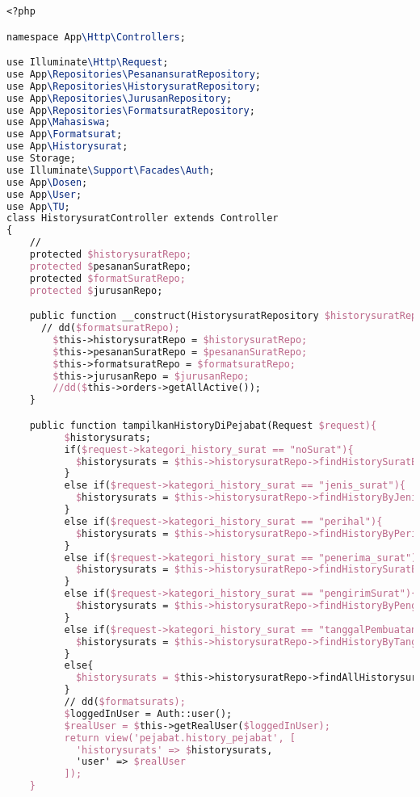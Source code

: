 \begin{lstlisting}[language=tex,basicstyle=\tiny,caption=HistorysuratController.php]
<?php

namespace App\Http\Controllers;

use Illuminate\Http\Request;
use App\Repositories\PesanansuratRepository;
use App\Repositories\HistorysuratRepository;
use App\Repositories\JurusanRepository;
use App\Repositories\FormatsuratRepository;
use App\Mahasiswa;
use App\Formatsurat;
use App\Historysurat;
use Storage;
use Illuminate\Support\Facades\Auth;
use App\Dosen;
use App\User;
use App\TU;
class HistorysuratController extends Controller
{
    //
    protected $historysuratRepo;
    protected $pesananSuratRepo;
    protected $formatSuratRepo;
    protected $jurusanRepo;

    public function __construct(HistorysuratRepository $historysuratRepo, PesanansuratRepository $pesananSuratRepo, FormatsuratRepository $formatsuratRepo, JurusanRepository $jurusanRepo){
      // dd($formatsuratRepo);
        $this->historysuratRepo = $historysuratRepo;
        $this->pesananSuratRepo = $pesananSuratRepo;
        $this->formatsuratRepo = $formatsuratRepo;
        $this->jurusanRepo = $jurusanRepo;
        //dd($this->orders->getAllActive());
    }

    public function tampilkanHistoryDiPejabat(Request $request){
          $historysurats;
          if($request->kategori_history_surat == "noSurat"){
            $historysurats = $this->historysuratRepo->findHistorySuratByNomorSurat($request->searchBox);
          }
          else if($request->kategori_history_surat == "jenis_surat"){
            $historysurats = $this->historysuratRepo->findHistoryByJenisSurat($request->searchBox);
          }
          else if($request->kategori_history_surat == "perihal"){
            $historysurats = $this->historysuratRepo->findHistoryByPerihal($request->searchBox);
          }
          else if($request->kategori_history_surat == "penerima_surat"){
            $historysurats = $this->historysuratRepo->findHistorySuratByPenerimaSurat($request->searchBox);
          }
          else if($request->kategori_history_surat == "pengirimSurat"){
            $historysurats = $this->historysuratRepo->findHistoryByPengirimSurat($request->searchBox);
          }
          else if($request->kategori_history_surat == "tanggalPembuatan"){
            $historysurats = $this->historysuratRepo->findHistoryByTanggalPembuatan($request->searchBox);
          }
          else{
            $historysurats = $this->historysuratRepo->findAllHistorysurat();
          }
          // dd($formatsurats);
          $loggedInUser = Auth::user();
          $realUser = $this->getRealUser($loggedInUser);
          return view('pejabat.history_pejabat', [
            'historysurats' => $historysurats,
            'user' => $realUser
          ]);
  	}


\end{lstlisting}
